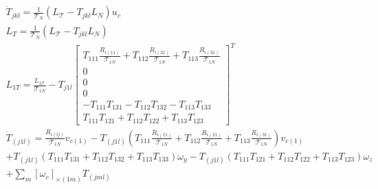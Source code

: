 \begin{equation}
\begin{gathered}
    \dot{T}_{jkl} = \frac{1}{\mathcal{T}_{N}} (L_{\mathcal{T}} - T_{jkl} L_{N}) u_c\\
    L_{T} = \frac{1}{\mathcal{T}_{N}} (L_{\mathcal{T}} - T_{jkl} L_{N})\\
    L_{1T} = \frac{L_{1\mathcal{T}}}{\mathcal{T}_{1N}} - T_{j1l} \begin{bmatrix}T_{111}\frac{R_{i(11)}}{\mathcal{T}_{1N}} + T_{112}\frac{R_{i(21)}}{\mathcal{T}_{1N}} + T_{113}\frac{R_{i(31)}}{\mathcal{T}_{1N}} \\ 0 \\ 0 \\ 0 \\ -T_{111}T_{131} - T_{112}T_{132} - T_{113}T_{133} \\  T_{111}T_{121} + T_{112}T_{122} + T_{113}T_{123}\end{bmatrix}^{T}\\
    \dot{T}_{(j1l)} = \frac{R_{i(lj)}}{\mathcal{T}_{1N}}v_{c(1)} -T_{(j1l)}(T_{111}\frac{R_{i(11)}}{\mathcal{T}_{1N}} + T_{112}\frac{R_{i(21)}}{\mathcal{T}_{1N}} + T_{113}\frac{R_{i(31)}}{\mathcal{T}_{1N}}) v_{c(1)}\\ + T_{(j1l)}(T_{111}T_{131} + T_{112}T_{132} + T_{113}T_{133})\omega_y - T_{(j1l)}(T_{111}T_{121} + T_{112}T_{122} + T_{113}T_{123})\omega_z \\+\sum_{m} {[\omega_{c}]}_{\times(1m)} T_{(jml)}\\
  \end{gathered}\label{eq:tensornormalizationk1}
\end{equation}
%
